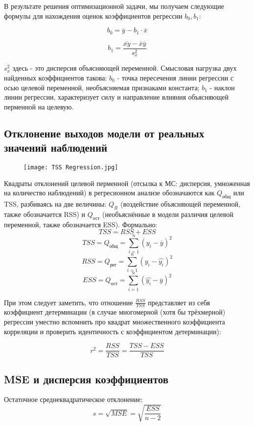 \documentclass[a4paper,12pt]{article} %
\begin{document}
В результате решения оптимизационной задачи, мы получаем следующие формулы для нахождения оценок коэффициентов регрессии $b_0, b_1$:

\[ b_0 = \overline{y}-b_1\cdot \overline{x} \]

\[b_1 = \frac{\overline{xy}-\overline{x}\overline{y}}{s_x^2} \]

$s_x^2$ здесь - это дисперсия объясняющей переменной. Смысловая нагрузка двух найденных коэффициентов такова: $b_0$ - точка пересечения линии регрессии с осью целевой переменной, необъясняемая признаками константа; $b_1$ - наклон линии регрессии, характеризует силу и направление влияния объясняющей перменной на целевую.

\subsection{Отклонение выходов модели от реальных значений наблюдений}

\begin{figure}[htp]
    \centering
    \texttt{[image: TSS Regression.jpg]}
\end{figure}

Квадраты отклонений целевой перменной (отсылка к МС: дисперсия, умноженная на количество наблюдений) в регресионном анализе обозначаются как $Q_{\text{общ}}$ или TSS, разбиваясь на две величины: $Q_R$ (воздействие объясняющей переменной, также обозначается RSS) и $Q_{\text{ост}}$ (необъяснённые в модели различия целевой переменной, также обозначается ESS).  Формально:
\[TSS=RSS+ESS\]
\[TSS=Q_{\text{общ}}=\sum\limits_{i=1}^n (y_i-\overline{y})^2\]
\[RSS=Q_{\text{рег}}=\sum\limits_{i=1}^n (y_i-\hat{y_i})^2\]
\[ESS=Q_{\text{ост}}=\sum\limits_{i=1}^n (\hat{y_i}-\overline{y})^2\]

При этом следует заметить, что отношение $\frac{RSS}{TSS}$ представляет из себя коэффициент детерминации (в случае многомерной (хотя бы трёхмерной) регрессии уместно вспомнить про квадрат множественного коэффициента корреляции и проверить идентичность с коэффициентом детерминации):

\[r^2=\frac{RSS}{TSS}=\frac{TSS-ESS}{TSS}\]

\subsection{MSE и дисперсия коэффициентов}

Остаточное среднеквадратическое отклонение:
\[s=\sqrt{MSE}=\sqrt{\frac{ESS}{n-2}}\]
\end{document}
